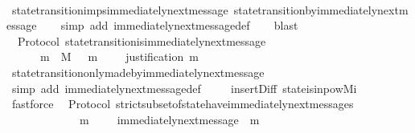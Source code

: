 \begin{isabellebody}
%
\isadelimproof
\ \ %
\endisadelimproof
%
\isatagproof
{}\isamarkupfalse%
\ state{\isacharunderscore}transition{\isacharunderscore}imps{\isacharunderscore}immediately{\isacharunderscore}next{\isacharunderscore}message\ state{\isacharunderscore}transition{\isacharunderscore}by{\isacharunderscore}immediately{\isacharunderscore}next{\isacharunderscore}message\isanewline
\ \ \isamarkupfalse%
\ {\isacharparenleft}simp\ add{\isacharcolon}\ immediately{\isacharunderscore}next{\isacharunderscore}message{\isacharunderscore}def{\isacharparenright}\isanewline
\ \ \isamarkupfalse%
\ blast%
\endisatagproof
{\isafoldproof}%
%
\isadelimproof
\isanewline
%
\endisadelimproof
\isanewline
{}\isamarkupfalse%
\ {\isacharparenleft}\ Protocol{\isacharparenright}\ state{\isacharunderscore}transition{\isacharunderscore}is{\isacharunderscore}immediately{\isacharunderscore}next{\isacharunderscore}message{\isacharcolon}\ \isanewline
\ \ {\isachardoublequoteopen}{\isasymforall}\ {\isasymsigma}\ {\isasymin}{\isasymSigma}{\isachardot}\ {\isasymforall}\ m\ {\isasymin}\ M{\isachardot}\ {\isasymsigma}\ {\isasymunion}\ {\isacharbraceleft}m{\isacharbraceright}\ {\isasymin}\ {\isasymSigma}\ \ {\isasymlongleftrightarrow}\ justification\ m\ {\isasymsubseteq}\ {\isasymsigma}{\isachardoublequoteclose}\isanewline
%
\isadelimproof
\ \ %
\endisadelimproof
%
\isatagproof
{}\isamarkupfalse%
\ state{\isacharunderscore}transition{\isacharunderscore}only{\isacharunderscore}made{\isacharunderscore}by{\isacharunderscore}immediately{\isacharunderscore}next{\isacharunderscore}message\ \isanewline
\ \ \isamarkupfalse%
\ {\isacharparenleft}simp\ add{\isacharcolon}\ immediately{\isacharunderscore}next{\isacharunderscore}message{\isacharunderscore}def{\isacharparenright}\ \isanewline
\ \ \isamarkupfalse%
\ insert{\isacharunderscore}Diff\ state{\isacharunderscore}is{\isacharunderscore}in{\isacharunderscore}pow{\isacharunderscore}Mi\ \isamarkupfalse%
\ fastforce%
\endisatagproof
{\isafoldproof}%
%
\isadelimproof
\isanewline
%
\endisadelimproof
\isanewline
{}\isamarkupfalse%
\ {\isacharparenleft}\ Protocol{\isacharparenright}\ strict{\isacharunderscore}subset{\isacharunderscore}of{\isacharunderscore}state{\isacharunderscore}have{\isacharunderscore}immediately{\isacharunderscore}next{\isacharunderscore}messages{\isacharcolon}\ \isanewline
\ \ {\isachardoublequoteopen}{\isasymforall}\ {\isasymsigma}\ {\isasymin}\ {\isasymSigma}{\isachardot}\ {\isasymforall}\ {\isasymsigma}{\isacharprime}{\isachardot}\ {\isasymsigma}{\isacharprime}\ {\isasymsubset}\ {\isasymsigma}\ {\isasymlongrightarrow}\ {\isacharparenleft}{\isasymexists}\ m\ {\isasymin}\ {\isasymsigma}\ {\isacharminus}\ {\isasymsigma}{\isacharprime}{\isachardot}\ immediately{\isacharunderscore}next{\isacharunderscore}message\ {\isacharparenleft}{\isasymsigma}{\isacharprime}{\isacharcomma}\ m{\isacharparenright}{\isacharparenright}{\isachardoublequoteclose}\isanewline

\end{isabellebody}
